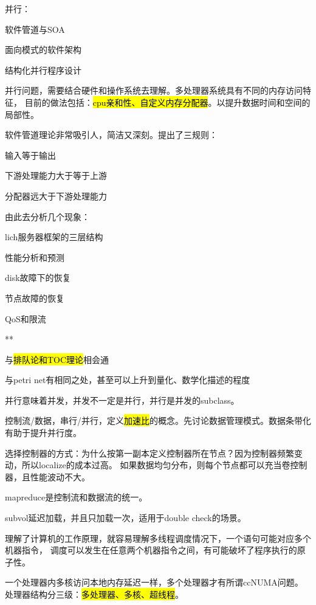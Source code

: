 并行：
\begin{enumbox}
\item 软件管道与SOA
\item 面向模式的软件架构
\item 结构化并行程序设计
\end{enumbox}

并行问题，需要结合硬件和操作系统去理解。多处理器系统具有不同的内存访问特征，
目前的做法包括：\hl{cpu亲和性、自定义内存分配器}。以提升数据时间和空间的局部性。

软件管道理论非常吸引人，简洁又深刻。提出了三规则：
\begin{enumbox}
\item 输入等于输出
\item 下游处理能力大于等于上游
\item 分配器远大于下游处理能力
\end{enumbox}

由此去分析几个现象：
\begin{enumbox}
\item lich服务器框架的三层结构
\item 性能分析和预测
\item disk故障下的恢复
\item 节点故障的恢复
\item QoS和限流
\item ***
\item 与\hl{排队论和TOC理论}相会通
\item 与petri net有相同之处，甚至可以上升到量化、数学化描述的程度
\end{enumbox}

并行意味着并发，并发不一定是并行，并行是并发的subclass。

控制流/数据，串行/并行，定义\hl{加速比}的概念。先讨论数据管理模式。数据条带化有助于提升并行度。

选择控制器的方式：为什么按第一副本定义控制器所在节点？因为控制器频繁变动，所以localize的成本过高。
如果数据均匀分布，则每个节点都可以充当卷控制器，且性能波动不大。

mapreduce是控制流和数据流的统一。

subvol延迟加载，并且只加载一次，适用于double check的场景。

理解了计算机的工作原理，就容易理解多线程调度情况下，一个语句可能对应多个机器指令，
调度可以发生在任意两个机器指令之间，有可能破坏了程序执行的原子性。

一个处理器内多核访问本地内存延迟一样，多个处理器才有所谓ccNUMA问题。
处理器结构分三级：\hl{多处理器、多核、超线程}。

